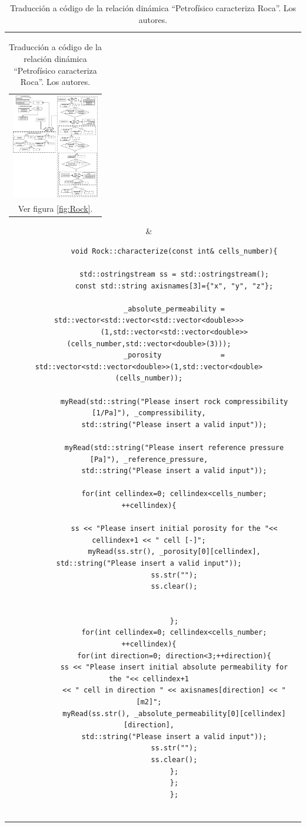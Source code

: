 \begin{table}[h]
	\centering
	\begin{tabular}{cc}
		\parbox[c]{5em}{
			\begin{tabular}[c]{@{}c@{}}\includegraphics[width=1.5in]{Fig/Rock.pdf}\\ Ver figura \ref{fig:Rock}.\end{tabular}
		}
		&
		\begin{tiny}
			\begin{lstlisting}
			void Rock::characterize(const int& cells_number){
			
			std::ostringstream ss = std::ostringstream();
			const std::string axisnames[3]={"x", "y", "z"};
			
			_absolute_permeability = std::vector<std::vector<std::vector<double>>>
			(1,std::vector<std::vector<double>>(cells_number,std::vector<double>(3)));
			_porosity              = std::vector<std::vector<double>>(1,std::vector<double>(cells_number));
			
			myRead(std::string("Please insert rock compressibility [1/Pa]"), _compressibility,
			std::string("Please insert a valid input"));
			
			myRead(std::string("Please insert reference pressure [Pa]"), _reference_pressure,
			std::string("Please insert a valid input"));
			
			for(int cellindex=0; cellindex<cells_number; ++cellindex){
			
			ss << "Please insert initial porosity for the "<< cellindex+1 << " cell [-]";
			myRead(ss.str(), _porosity[0][cellindex], std::string("Please insert a valid input"));
			ss.str("");
			ss.clear();
			
			
			};
			for(int cellindex=0; cellindex<cells_number; ++cellindex){
			for(int direction=0; direction<3;++direction){
			ss << "Please insert initial absolute permeability for the "<< cellindex+1
			<< " cell in direction " << axisnames[direction] << " [m2]";
			myRead(ss.str(), _absolute_permeability[0][cellindex][direction],
			std::string("Please insert a valid input"));
			ss.str("");
			ss.clear();
			};
			};
			};
			
			\end{lstlisting}
		\end{tiny}
	\end{tabular}
	\label{tab:RockCharacterizeCode}
	\caption[Traducción a código de la relación dinámica ``Petrofísico caracteriza Roca''.]{Traducción a código de la relación dinámica ``Petrofísico caracteriza Roca''. Los autores.}
\end{table}


